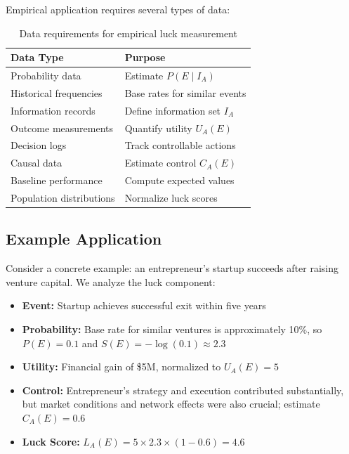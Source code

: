   Empirical application requires several types of data:

  \begin{table}[H]
    \centering
    \begin{tabular}{ll}
      \toprule \textbf{Data Type} & \textbf{Purpose}               \\
      \midrule Probability data   & Estimate $P(E \mid I_{A})$     \\
      Historical frequencies      & Base rates for similar events  \\
      Information records         & Define information set $I_{A}$ \\
      Outcome measurements        & Quantify utility $U_{A}(E)$    \\
      Decision logs               & Track controllable actions     \\
      Causal data                 & Estimate control $C_{A}(E)$    \\
      Baseline performance        & Compute expected values        \\
      Population distributions    & Normalize luck scores          \\
      \bottomrule
    \end{tabular}
    \caption{Data requirements for empirical luck measurement}
    \label{tab:data}
  \end{table}

  \subsection{Example Application}

  Consider a concrete example: an entrepreneur's startup succeeds after
  raising venture capital. We analyze the luck component:

  \begin{itemize}
    \item \textbf{Event:} Startup achieves successful exit within five
      years

    \item \textbf{Probability:} Base rate for similar ventures is
      approximately 10\%, so $P(E) = 0.1$ and
      $S(E) = -\log(0.1) \approx 2.3$

    \item \textbf{Utility:} Financial gain of \$5M, normalized to
      $U_{A}(E) = 5$

    \item \textbf{Control:} Entrepreneur's strategy and execution
      contributed substantially, but market conditions and network effects
      were also crucial; estimate $C_{A}(E) = 0.6$

    \item \textbf{Luck Score:}
      $L_{A}(E) = 5 \times 2.3 \times (1 - 0.6) = 4.6$
  \end{itemize}

